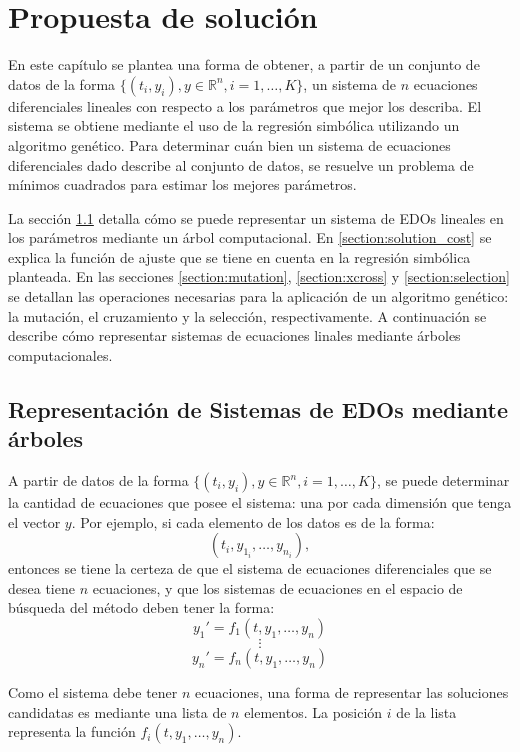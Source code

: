 \chapter{Propuesta de solución}\label{chapter:solution_proposal}

En este capítulo se plantea una forma de obtener, a partir de un conjunto de datos de la forma $\{(t_i, y_i), y \in \mathbb{R}^n, i = 1, \dots, K\}$, un sistema de $n$ ecuaciones diferenciales lineales con respecto a los parámetros que mejor los describa. El sistema se obtiene mediante el uso de la regresión simbólica utilizando un algoritmo genético. Para determinar cuán bien un sistema de ecuaciones diferenciales dado describe al conjunto de datos, se resuelve un problema de mínimos cuadrados para estimar los mejores parámetros.

La sección \ref{section:solution_representation} detalla cómo se puede representar un sistema de EDOs lineales en los parámetros mediante un árbol computacional. En \ref{section:solution_cost} se explica la función de ajuste que se tiene en cuenta en la regresión simbólica planteada. En las secciones \ref{section:mutation}, \ref{section:xcross} y \ref{section:selection} se detallan las operaciones necesarias para la aplicación de un algoritmo genético: la mutación, el cruzamiento y la selección, respectivamente. A continuación se describe cómo representar sistemas de ecuaciones linales mediante árboles computacionales.


\section{Representación de Sistemas de EDOs mediante árboles}\label{section:solution_representation}

A partir de datos de la forma $\{(t_i, y_i), y \in \mathbb{R}^n, i = 1, \dots, K\}$, se puede determinar la cantidad de ecuaciones que posee el sistema: una por cada dimensión que tenga el vector $y$. Por ejemplo, si cada elemento de los datos es de la forma:
$$(t_i, y_{1_i}, \dots, y_{n_i}),$$
entonces se tiene la certeza de que el sistema de ecuaciones diferenciales que se desea tiene $n$ ecuaciones, y que los sistemas de ecuaciones en el espacio de búsqueda del método deben tener la forma:
$$y_1' = f_1(t, y_1, \dots, y_n)$$
$$\vdots$$
$$y_n' = f_n(t, y_1, \dots, y_n)$$

Como el sistema debe tener $n$ ecuaciones, una forma de representar las soluciones candidatas es mediante una lista de $n$ elementos. La posición $i$ de la lista representa la función $f_i(t,y_1, \dots, y_n)$.

